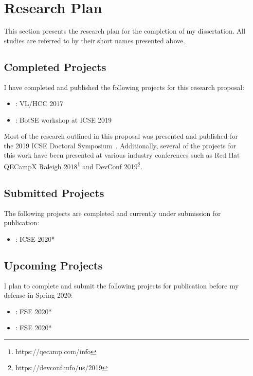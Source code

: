 \section{Research Plan}

This section presents the research plan for the completion of my dissertation. All studies are referred to by their short names presented above.

\subsection{Completed Projects}

I have completed and published the following projects for this research proposal:

\begin{itemize}
    \item[] \peer: VL/HCC 2017~\cite{VLHCC}
    \item[] \sorry: BotSE workshop at ICSE 2019~\cite{BotSE}
\end{itemize}

Most of the research outlined in this proposal was presented and published for the 2019 ICSE Doctoral Symposium~\cite{Symposium}. Additionally, several of the projects for this work have been presented at various industry conferences such as Red Hat QECampX Raleigh 2018\footnote{https://qecamp.com/info} and DevConf 2019\footnote{https://devconf.info/us/2019}.

\subsection{Submitted Projects}

The following projects are completed and currently under submission for publication:

\begin{itemize}
    \item[] \sugg: ICSE 2020*
\end{itemize}

\subsection{Upcoming Projects}

I plan to complete and submit the following projects for publication before my defense in Spring 2020:

\begin{itemize}
    \item[] \textbf{\proc}: FSE 2020*
    \item[] \nudge: FSE 2020*
\end{itemize}

